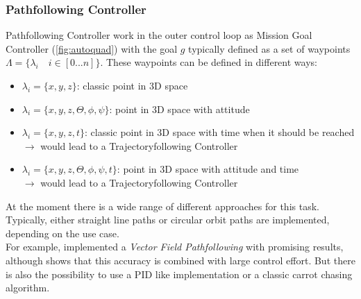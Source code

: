 \subsubsection{Pathfollowing Controller}
Pathfollowing Controller work in the outer control loop as Mission Goal Controller (\cref{fig:autoquad}) with the goal $g$ typically defined as a set of waypoints $\Lambda = \{\lambda_i \quad i \in [0...n]\}$. 
These waypoints can be defined in different ways:
\begin{itemize}
	\item  $\lambda_i = \{x,y,z\}$: classic point in 3D space
	\item  $\lambda_i = \{x,y,z,\Theta, \phi, \psi\}$: point in 3D space with attitude
	\item  $\lambda_i = \{x,y,z,t\}$: classic point in 3D space with time when it should be reached\\
	$\rightarrow$ would lead to a Trajectoryfollowing Controller
	\item  $\lambda_i = \{x,y,z,\Theta, \phi, \psi, t\}$: point in 3D space with attitude and time\\
	$\rightarrow$ would lead to a Trajectoryfollowing Controller
\end{itemize}
At the moment there is a wide range of different approaches for this task. Typically,
either straight line paths or circular orbit paths are implemented, depending on the use case.\\
For example, \cite{nelson2007vector} implemented a \emph{Vector Field Pathfollowing} with promising results, 
although \cite{6669680} shows that this accuracy is combined with large control effort. 
But there is also the possibility to use a PID like implementation or a classic carrot chasing algorithm.\\

\newpage


